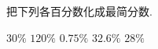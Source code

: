 把下列各百分数化成最简分数.
\begin{subquestions}
    \subquestion $30\%$
    \subquestion $120\%$
    \subquestion $0.75\%$
    \subquestion $32.6\%$
    \subquestion $28\%$

\end{subquestions}
